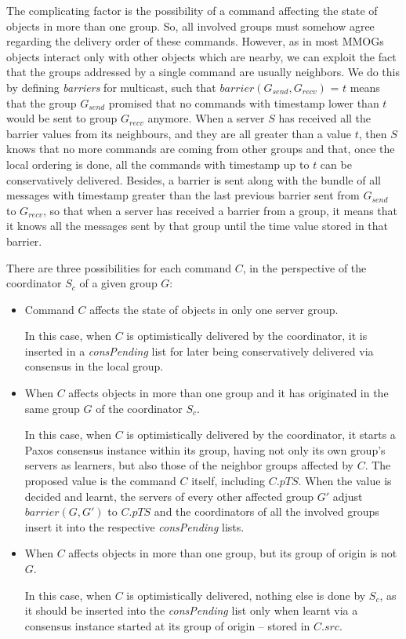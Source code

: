\documentclass[times, 10pt]{article}
\begin{document}
The complicating factor is the possibility of a command affecting the state of objects in more than one group. So, all involved groups must somehow agree regarding the delivery order of these commands. However, as in most MMOGs objects interact only with other objects which are nearby, we can exploit the fact that the groups addressed by a single command are usually neighbors. We do this by defining \emph{barriers} for multicast, such that $barrier(G_{send},G_{recv})$ = $t$ means that the group $G_{send}$ promised that no commands with timestamp lower than $t$ would be sent to group $G_{recv}$ anymore. When a server $S$ has received all the barrier values from its neighbours, and they are all greater than a value $t$, then $S$ knows that no more commands are coming from other groups and that, once the local ordering is done, all the commands with timestamp up to $t$ can be conservatively delivered. Besides, a barrier is sent along with the bundle of all messages with timestamp greater than the last previous barrier sent from $G_{send}$ to $G_{recv}$, so that when a server has received a barrier from a group, it means that it knows all the messages sent by that group until the time value stored in that barrier. 

There are three possibilities for each command $C$, in the perspective of the coordinator $S_c$ of a given group $G$:

\begin{itemize}
  \item Command $C$ affects the state of objects in only one server group.
  
  In this case, when $C$ is optimistically delivered by the coordinator, it is inserted in a \textit{consPending} list for later being conservatively delivered via consensus in the local group.

  \item When $C$ affects objects in more than one group and it has originated in the same group $G$ of the coordinator $S_c$.
  
  In this case, when $C$ is optimistically delivered by the coordinator, it starts a Paxos consensus instance within its group, having not only its own group's servers as learners, but also those of the neighbor groups affected by $C$. The proposed value is the command $C$ itself, including $C.pTS$. When the value is decided and learnt, the servers of every other affected group $G'$ adjust $barrier(G, G')$ to $C.pTS$ and the coordinators of all the involved groups insert it into the respective \textit{consPending} lists. 
  
  \item When $C$ affects objects in more than one group, but its group of origin is not $G$.
  
  In this case, when $C$ is optimistically delivered, nothing else is done by $S_c$, as it should be inserted into the \textit{consPending} list only when learnt via a consensus instance started at its group of origin -- stored in $C.src$.
\end{itemize}
\end{document}
